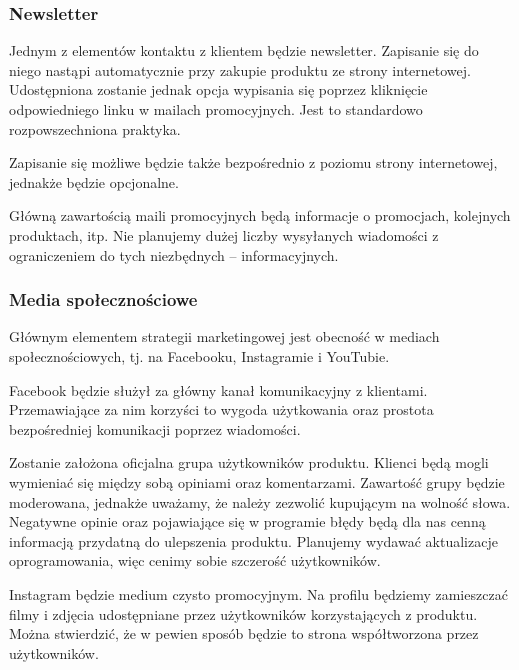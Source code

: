\documentclass[12pt]{article}
\begin{document}
\subsubsection{Newsletter}

Jednym z elementów kontaktu z klientem będzie newsletter.
Zapisanie się do niego nastąpi automatycznie przy zakupie produktu ze strony internetowej.
Udostępniona zostanie jednak opcja wypisania się poprzez kliknięcie odpowiedniego linku w mailach promocyjnych.
Jest to standardowo rozpowszechniona praktyka.

Zapisanie się możliwe będzie także bezpośrednio z poziomu strony internetowej, jednakże będzie opcjonalne.

Główną zawartością maili promocyjnych będą informacje o promocjach, kolejnych produktach, itp.
Nie planujemy dużej liczby wysyłanych wiadomości z ograniczeniem do tych niezbędnych -- informacyjnych.

\subsubsection{Media społecznościowe}

Głównym elementem strategii marketingowej jest obecność w mediach społecznościowych, tj. na Facebooku, Instagramie i YouTubie.

Facebook będzie służył za główny kanał komunikacyjny z klientami.
Przemawiające za nim korzyści to wygoda użytkowania oraz prostota bezpośredniej komunikacji poprzez wiadomości.


Zostanie założona oficjalna grupa użytkowników produktu.
Klienci będą mogli wymieniać się między sobą opiniami oraz komentarzami.
Zawartość grupy będzie moderowana, jednakże uważamy, że należy zezwolić kupującym na wolność słowa.
Negatywne opinie oraz pojawiające się w programie błędy będą dla nas cenną informacją przydatną do ulepszenia produktu.
Planujemy wydawać aktualizacje oprogramowania, więc cenimy sobie szczerość użytkowników.

Instagram będzie medium czysto promocyjnym.
Na profilu będziemy zamieszczać filmy i zdjęcia udostępniane przez użytkowników korzystających z produktu.
Można stwierdzić, że w pewien sposób będzie to strona współtworzona przez użytkowników.
\end{document}
